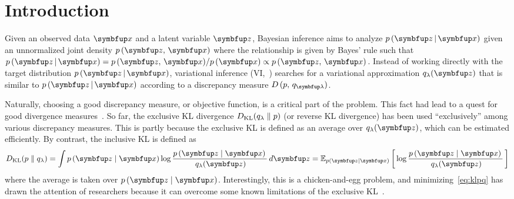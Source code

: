 
\section{Introduction}
Given an observed data \(\vx\) and a latent variable \(\vz\), Bayesian inference aims to analyze \(p\,(\vz\,|\,\vx)\) given an unnormalized joint density \(p\,(\vz,\,\vx)\) where the relationship is given by Bayes' rule such that \(p\,(\vz\,|\,\vx) = {p\,(\vz,\,\vx)}/{p\,(\vx)} \propto p\,(\vz,\,\vx)\).
Instead of working directly with the target distribution \(p\,(\vz\,|\,\vx)\), variational inference (VI,~\citealt{jordan_introduction_1999, blei_variational_2017, zhang_advances_2019}) searches for a variational approximation \(q_{\lambda}(\vz)\) that is similar to \(p\,(\vz\,|\,\vx)\) according to a discrepancy measure \(D\,(p,\, q_{\vlambda})\).

Naturally, choosing a good discrepancy measure, or objective function, is a critical part of the problem.
This fact had lead to a quest for good divergence measures~\citep{NIPS2016_7750ca35, NIPS2017_35464c84, NEURIPS2018_1cd138d0, pmlr-v97-ruiz19a}.
So far, the exclusive KL divergence \(D_{\mathrm{KL}}(q_{\lambda}\parallel p)\) (or reverse KL divergence) has been used ``exclusively'' among various discrepancy measures.
This is partly because the exclusive KL is defined as an average over \(q_{\lambda}(\vz)\), which can be estimated efficiently.
By contrast, the inclusive KL is defined as
%
\vspace{-0.02in}
\begin{align}
  \DKL{p}{q_{\lambda}} = \int p\,(\vz\mid\vx) \log \frac{p\,(\vz\mid\vx)\,}{\,q_{\lambda}(\vz)} \,d\vz
  = \Esub{p(\vz\mid\vx)}{\log \frac{p\,(\vz\mid\vx)\,}{\,q_{\lambda}(\vz)} } \label{eq:klpq}
\end{align}
\vspace{-0.02in}
%
where the average is taken over \(p\,(\vz\mid\vx)\). 
Interestingly, this is a chicken-and-egg problem, and minimizing~\eqref{eq:klpq} has drawn the attention of researchers because it can overcome some known limitations of the exclusive KL~\citep{minka2005divergence, mackay_local_2001}.

